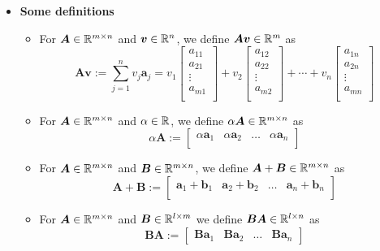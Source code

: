 \documentclass[12pt,a4paper]{article}
\begin{document}
\begin{itemize}
\item \textbf{Some definitions}
  \begin{itemize}
  \item For $\bm{A}\in \mathbb{R}^{m\times n}$ and $\bm{v}\in \mathbb{R}^{n}$,
    we define $\bm{A}\bm{v}\in \mathbb{R}^{m}$ as
    \begin{equation}\nonumber%
      \bm{A}\bm{v} := \sum_{j=1}^{n}v_{j}\bm{a}_{j}
      =
      v_{1}
      \begin{bmatrix}
        a_{11}\\
        a_{21}\\
        \vdots \\
        a_{m1}\\
      \end{bmatrix}
      +
      v_{2}
      \begin{bmatrix}
        a_{12}\\
        a_{22}\\
        \vdots \\
        a_{m2}\\
      \end{bmatrix}
      + \cdots +
      v_{n}
      \begin{bmatrix}
        a_{1n}\\
        a_{2n}\\
        \vdots \\
        a_{mn}\\
      \end{bmatrix}
    \end{equation}
  \item For $\bm{A}\in \mathbb{R}^{m\times n}$ and $\alpha \in \mathbb{R}$, we define $\alpha\bm{A}\in \mathbb{R}^{m\times n}$ as
    \begin{equation}\nonumber%
      \alpha\bm{A} := 
      \begin{bmatrix}
        \alpha\bm{a}_{1} & \alpha\bm{a}_{2} & \ldots & \alpha\bm{a}_{n} \\
      \end{bmatrix}
    \end{equation}
  \item For $\bm{A}\in \mathbb{R}^{m\times n}$ and $\bm{B}\in \mathbb{R}^{m\times n}$,
    we define $\bm{A}+\bm{B}\in \mathbb{R}^{m\times n}$ as
    \begin{equation}\nonumber%
      \bm{A} + \bm{B} :=
      \begin{bmatrix}
        \bm{a}_{1}+\bm{b}_{1} & \bm{a}_{2}+\bm{b}_{2} & \ldots & \bm{a}_{n}+\bm{b}_{n} \\
      \end{bmatrix}
    \end{equation}
  \item For $\bm{A} \in \mathbb{R}^{m\times n}$ and $\bm{B}\in \mathbb{R}^{l\times m}$
    we define $\bm{B}\bm{A}\in \mathbb{R}^{l\times n}$ as
    \begin{equation}\nonumber%
      \bm{B}\bm{A} :=
      \begin{bmatrix}
        \bm{B}\bm{a}_{1} & \bm{B}\bm{a}_{2} & \ldots & \bm{B}\bm{a}_{n}
      \end{bmatrix}
    \end{equation}
  \end{itemize}


\end{itemize}
\end{document}
